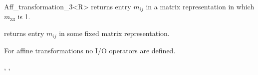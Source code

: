 \begin{ccRefClass}{Aff_transformation_3<R>}
                      {}
\ccGlue
{}
       {returns entry $m_{ij}$ in a matrix representation in which $m_{33}$ is 1.}

                      {}
\ccGlue
{}
       {returns entry $m_{ij}$ in some fixed matrix representation.} 

For affine transformations  no I/O operators are defined.

\ccSeeAlso
{}, 
,


\end{ccRefClass} 
